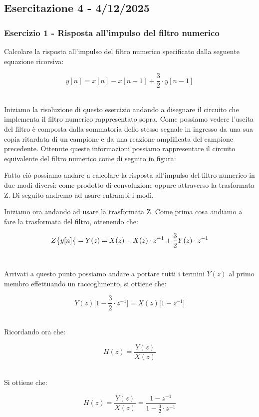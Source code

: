 \documentclass[../main.tex]{subfiles}
\begin{document}
\clearpage
\thispagestyle{empty}
\vspace*{7cm}
\subsection{Esercitazione 4 - 4/12/2025}
\vspace*{1.5cm}


\subsubsection{Esercizio 1 - Risposta all’impulso del filtro numerico}

Calcolare la risposta all’impulso del filtro numerico specificato dalla seguente
equazione ricorsiva:

\[ y[n] = x[n] - x[n-1] + \frac{3}{2} \cdot y[n - 1]\]\

Iniziamo la risoluzione di questo esercizio andando a disegnare il circuito che implementa il filtro numerico rappresentato sopra.
Come possiamo vedere l'uscita del filtro è composta dalla sommatoria dello stesso segnale in ingresso da una sua copia ritardata di un campione e da una reazione amplificata del campione precedente.
Ottenute queste informazioni possiamo rappresentare il circuito equivalente del filtro numerico come di seguito in figura:


Fatto ciò possiamo andare a calcolare la risposta all’impulso del filtro numerico in due modi diversi: come prodotto di convoluzione oppure attraverso la trasformata Z. Di seguito andremo ad usare entrambi i modi.

Iniziamo ora andando ad usare la trasformata Z. 
Come prima cosa andiamo a fare la trasformata del filtro, ottenendo che:

\[ Z \big{ \{ }y[n]\big{ \{ } = Y(z) = X(z) - X(z) \cdot z^{-1} + \frac{3}{2} Y(z)\cdot z^{-1} \]\

Arrivati a questo punto possiamo andare a portare tutti i termini $Y(z)$ al primo membro effettuando un raccoglimento, si ottiene che:

\[ Y(z) \big[ 1 - \frac{3}{2}\cdot z^{-1} \big] = X(z) \big[ 1 - z^{-1} \big] \]\

Ricordando ora che:

\[ H(z) = \frac{Y(z)}{X(z)} \]\

Si ottiene che:

\[ H(z) = \frac{Y(z)}{X(z)}  = \frac{1 - z^{-1} }{1 - \frac{3}{2}\cdot z^{-1}} \]\
\end{document}

